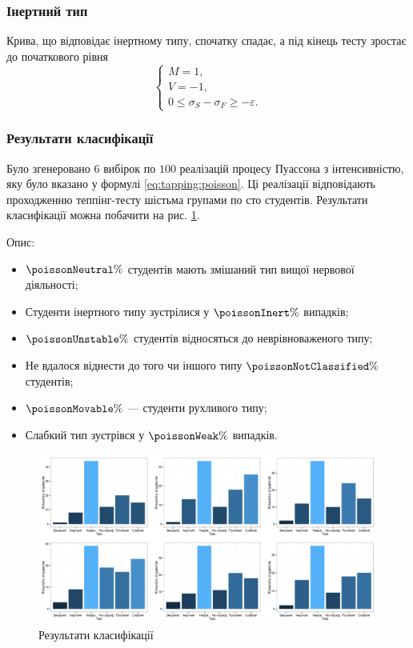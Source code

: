 \subsubsection{Інертний тип}
Крива, що відповідає інертному типу, спочатку спадає,
а під кінець тесту зростає до початкового рівня
\begin{equation*}
  \begin{cases}
    M = 1, \\
    V = -1, \\
    0 \le \sigma_S - \sigma_F \ge -\varepsilon.
  \end{cases}
\end{equation*}

\subsubsection{Результати класифікації}
Було згенеровано $6$ вибірок по $100$ реалізацій процесу Пуассона з
інтенсивністю, яку було вказано у формулі \eqref{eq:tapping:poisson}.
Ці реалізації відповідають проходженню теппінг-тесту шістьма групами по сто
студентів.
Результати класифікації можна побачити на рис. \ref{fig:tapping:poisson:types}.

Опис:
\begin{itemize}
  \item
    $\poissonNeutral\%$ студентів мають змішаний тип вищої нервової діяльності;
  \item
    Студенти інертного типу зустрілися у $\poissonInert\%$ випадків;
  \item
    $\poissonUnstable\%$ студентів відносяться до неврівноваженого типу;
  \item
    Не вдалося віднести до того чи іншого типу $\poissonNotClassified\%$ студентів;
  \item
    $\poissonMovable\%$ --- студенти рухливого типу;
  \item
    Слабкий тип зустрівся у $\poissonWeak\%$ випадків.
\end{itemize}

\begin{figure}[h!]
  \centering
  \includegraphics[width=\textwidth]{images/types}
  \caption{Результати класифікації}
  \label{fig:tapping:poisson:types}
\end{figure}

